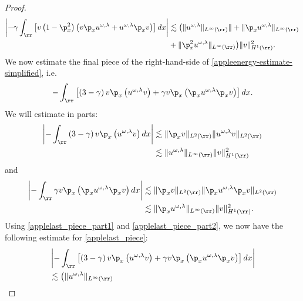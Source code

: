 \begin{proof}
\begin{equation}
\begin{split}
		\label{applesecond-piece-final}
		\left | -\gamma \int_{\rr}
		\left[ v\left( 1-\p_x^2 \right)\left( v \p_x u^{\omega,\lambda} + u^{\omega,\lambda} \p_x v
		\right) \right] dx \right |
		&\lesssim \left( \|u^{\omega,\lambda}\|_{L^\infty(\rr)}\| + \|\p_x u^{\omega,\lambda}
		\|_{L^\infty(\rr)} \right . 
		\\
		& + \|\p_x^2 u^{\omega,\lambda} \|_{L^\infty(\rr)}
		\big )\|v\|_{H^1(\rr)}^2.
	\end{split}
\end{equation}
We now estimate the final piece of the right-hand-side of
\eqref{appleenergy-estimate-simplified}, i.e.
\begin{equation}
	\label{applelast_piece}
	-\int_{\rr} \left[ \left( 3 -\gamma \right)v \p_x \left( u^{\omega,\lambda} v \right) + \gamma
	v \p_x \left( \p_x u^{\omega,\lambda} \p_x v \right)\right]dx.
\end{equation}
We will estimate in parts:
\begin{equation}
	\begin{split}
		\label{applelast_piece_part1}
		\left | -\int_{\rr}  \left( 3- \gamma \right)v \p_x\left( u^{\omega,\lambda} v \right)
		 dx \right | 
		& \lesssim \|\p_x v \|_{L^2(\rr)} \|u^{\omega,\lambda} v \|_{L^2(\rr)}
		\\
		& \lesssim \|u^{\omega,\lambda}\|_{L^\infty(\rr)} \|v\|_{H^1(\rr)}^2
	\end{split}
\end{equation}
and
\begin{equation}
	\begin{split}
		\label{applelast_piece_part2}
		\left | -\int_{\rr}  \gamma v \p_x \left( \p_x u^{\omega,\lambda} \p_x v
		\right) dx  \right | 
		& \lesssim \|\p_x v \|_{L^2(\rr)} \| \p_x u^{\omega,\lambda} \p_x v \|_{L^2(\rr)}
		\\
		& \lesssim \|\p_x u^{\omega,\lambda} \|_{L^\infty(\rr)} \|v \|_{H^1(\rr)}^2.
	\end{split}
\end{equation}
Using \eqref{applelast_piece_part1} and \eqref{applelast_piece_part2}, we now have the
following estimate for \eqref{applelast_piece}:
\begin{equation}
	\begin{split}
	\label{applelast_piece_final}
	& \left | -\int_{\rr} \left[ \left( 3-\gamma \right)v
	\p_x \left( u^{\omega,\lambda} v \right) + \gamma
	v \p_x \left( \p_x u^{\omega,\lambda} \p_x v \right)\right]dx \right |
	\\
	& \lesssim \big(
	\|u^{\omega,\lambda}\|_{L^\infty(\rr)}

\end{split}
\end{equation}
\end{proof}
